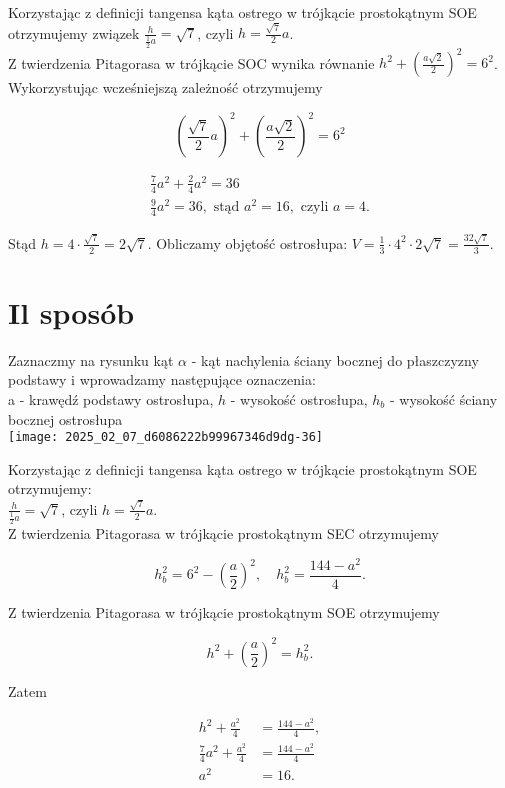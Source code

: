 \documentclass[10pt]{article}
\begin{document}
Korzystając z definicji tangensa kąta ostrego w trójkącie prostokątnym SOE otrzymujemy związek $\frac{h}{\frac{1}{2} a}=\sqrt{7}$, czyli $h=\frac{\sqrt{7}}{2} a$.\\
Z twierdzenia Pitagorasa w trójkącie SOC wynika równanie $h^{2}+\left(\frac{a \sqrt{2}}{2}\right)^{2}=6^{2}$.\\
Wykorzystując wcześniejszą zależność otrzymujemy

$$
\left(\frac{\sqrt{7}}{2} a\right)^{2}+\left(\frac{a \sqrt{2}}{2}\right)^{2}=6^{2}
$$

$$
\begin{gathered}
\frac{7}{4} a^{2}+\frac{2}{4} a^{2}=36 \\
\frac{9}{4} a^{2}=36, \text { stąd } a^{2}=16, \text { czyli } a=4 .
\end{gathered}
$$

Stąd $h=4 \cdot \frac{\sqrt{7}}{2}=2 \sqrt{7}$. Obliczamy objętość ostrosłupa: $V=\frac{1}{3} \cdot 4^{2} \cdot 2 \sqrt{7}=\frac{32 \sqrt{7}}{3}$.

\section*{Il sposób}
Zaznaczmy na rysunku kąt $\alpha$ - kąt nachylenia ściany bocznej do płaszczyzny podstawy i wprowadzamy następujące oznaczenia:\\
a - krawędź podstawy ostrosłupa, $h$ - wysokość ostrosłupa, $h_{b}$ - wysokość ściany bocznej ostrosłupa\\
\texttt{[image: 2025\_02\_07\_d6086222b99967346d9dg-36]}

Korzystając z definicji tangensa kąta ostrego w trójkącie prostokątnym SOE otrzymujemy:\\
$\frac{h}{\frac{1}{2} a}=\sqrt{7}$, czyli $h=\frac{\sqrt{7}}{2} a$.\\
Z twierdzenia Pitagorasa w trójkącie prostokątnym SEC otrzymujemy

$$
h_{b}^{2}=6^{2}-\left(\frac{a}{2}\right)^{2}, \quad h_{b}^{2}=\frac{144-a^{2}}{4} .
$$

Z twierdzenia Pitagorasa w trójkącie prostokątnym SOE otrzymujemy

$$
h^{2}+\left(\frac{a}{2}\right)^{2}=h_{b}^{2} .
$$

Zatem

$$
\begin{aligned}
h^{2}+\frac{a^{2}}{4} & =\frac{144-a^{2}}{4}, \\
\frac{7}{4} a^{2}+\frac{a^{2}}{4} & =\frac{144-a^{2}}{4} \\
a^{2} & =16 .
\end{aligned}
$$
\end{document}

